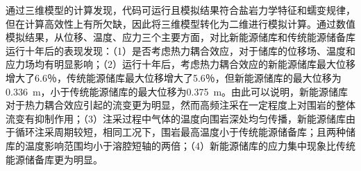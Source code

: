 通过三维模型的计算发现，代码可运行且模拟结果符合盐岩力学特征和蠕变规律，但在计算高效性上有所欠缺，因此将三维模型转化为二维进行模拟计算。通过数值模拟结果，从位移、温度、应力三个主要方面，对比新能源储库和传统能源储备库运行十年后的表现发现：（1）是否考虑热力耦合效应，对于储库的位移场、温度和应力场均有明显影响；（2）运行十年后，考虑热力耦合效应的新能源储库最大位移增大了6.6％，传统能源储库最大位移增大了5.6％，但新能源储库的最大位移为\SI{0.336}{m}，小于传统能源储库的最大位移为\SI{0.375}{m}。由此可以说明，新能源储库对于热力耦合效应引起的流变更为明显，然而高频注采在一定程度上对围岩的整体流变有抑制作用；（3）注采过程中气体的温度向围岩深处均匀传播，新能源储库由于循环注采周期较短，相同工况下，围岩最高温度小于传统能源储备库；且两种储库的温度影响范围均小于溶腔短轴的两倍；（4）新能源储库的应力集中现象比传统能源储备库更为明显。
